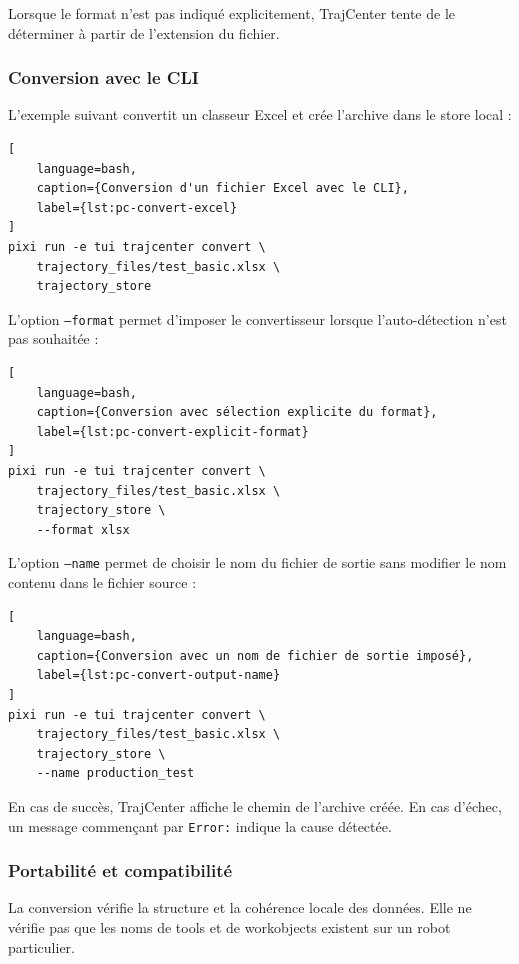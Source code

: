 \documentclass{rapportENSAM}
\begin{document}
Lorsque le format n'est pas indiqué explicitement, TrajCenter tente de le
déterminer à partir de l'extension du fichier.

\subsubsection{Conversion avec le CLI}
\label{subsubsec:pc-conversion-cli}

L'exemple suivant convertit un classeur Excel et crée l'archive dans le store
local :

\begin{lstlisting}[
    language=bash,
    caption={Conversion d'un fichier Excel avec le CLI},
    label={lst:pc-convert-excel}
]
pixi run -e tui trajcenter convert \
    trajectory_files/test_basic.xlsx \
    trajectory_store
\end{lstlisting}

L'option \texttt{--format} permet d'imposer le convertisseur lorsque
l'auto-détection n'est pas souhaitée :

\begin{lstlisting}[
    language=bash,
    caption={Conversion avec sélection explicite du format},
    label={lst:pc-convert-explicit-format}
]
pixi run -e tui trajcenter convert \
    trajectory_files/test_basic.xlsx \
    trajectory_store \
    --format xlsx
\end{lstlisting}

L'option \texttt{--name} permet de choisir le nom du fichier de sortie sans
modifier le nom contenu dans le fichier source :

\begin{lstlisting}[
    language=bash,
    caption={Conversion avec un nom de fichier de sortie imposé},
    label={lst:pc-convert-output-name}
]
pixi run -e tui trajcenter convert \
    trajectory_files/test_basic.xlsx \
    trajectory_store \
    --name production_test
\end{lstlisting}

En cas de succès, TrajCenter affiche le chemin de l'archive créée. En cas
d'échec, un message commençant par \texttt{Error:} indique la cause détectée.

\subsubsection{Portabilité et compatibilité}
\label{subsubsec:pc-conversion-compatibility}

La conversion vérifie la structure et la cohérence locale des données. Elle
ne vérifie pas que les noms de tools et de workobjects existent sur un robot
particulier.
\end{document}

